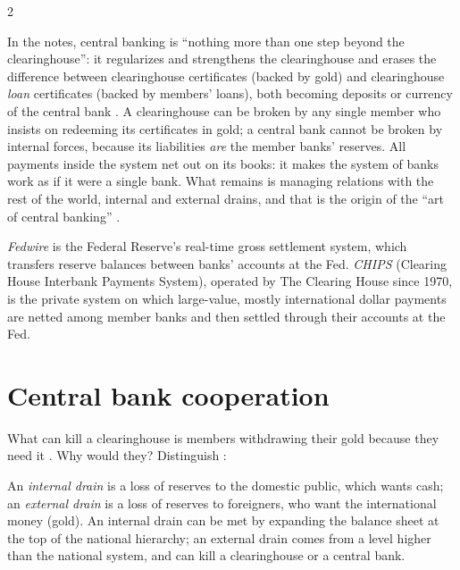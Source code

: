 \begin{paracol}{2}
\begin{intuition}
In the notes, central banking is ``nothing more than one step beyond the clearinghouse'': it regularizes and strengthens the clearinghouse and
erases the difference between clearinghouse certificates (backed by gold) and clearinghouse \emph{loan} certificates (backed by members' loans), both
becoming deposits or currency of the central bank . A clearinghouse can be broken by any single member who insists on redeeming its
certificates in gold; a central bank cannot be broken by internal forces, because its liabilities \emph{are} the member banks' reserves. All payments
inside the system net out on its books: it makes the system of banks work as if it were a single bank. What remains is managing relations with the
rest of the world, internal and external drains, and that is the origin of the ``art of central banking'' .
\end{intuition}

\begin{definition}
\emph{Fedwire} is the Federal Reserve's real-time gross settlement system, which transfers reserve balances between banks' accounts at the Fed.
\emph{CHIPS} (Clearing House Interbank Payments System), operated by The Clearing House since 1970, is the private system on which large-value, mostly
international dollar payments are netted among member banks and then settled through their accounts at the Fed.
\end{definition}

\section{Central bank cooperation}\label{sec:ch-coop}

What can kill a clearinghouse is members withdrawing their gold because they need it . Why would they? Distinguish
:

\begin{definition}
An \emph{internal drain} is a loss of reserves to the domestic public, which wants cash; an \emph{external drain} is a loss of reserves to foreigners,
who want the international money (gold). An internal drain can be met by expanding the balance sheet at the top of the national hierarchy; an
external drain comes from a level higher than the national system, and can kill a clearinghouse or a central bank.
\end{definition}


\end{paracol}
